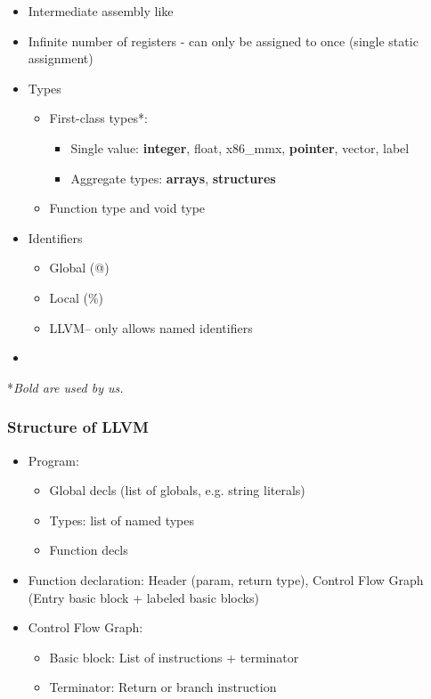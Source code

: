 \begin{itemize}
    \item Intermediate assembly like
    \item Infinite number of registers - can only be assigned to once (single static assignment)
    \item Types
    \begin{itemize}
        \item First-class types*: 
        \begin{itemize}
            \item Single value: \textbf{integer}, float, x86\_mmx, \textbf{pointer}, vector, label
            \item Aggregate types: \textbf{arrays}, \textbf{structures}
        \end{itemize}
        \item Function type and void type
    \end{itemize}
    \item Identifiers
    \begin{itemize}
        \item Global (@)
        \item Local (\%)
        \item LLVM-- only allows named identifiers
    \end{itemize}
    \item 
\end{itemize}

*\textit{Bold are used by us.}\\

\subsubsection{Structure of LLVM}

\begin{itemize}
    \item Program:
    \begin{itemize}
        \item Global decls (list of globals, e.g. string literals)
        \item Types: list of named types
        \item Function decls
    \end{itemize}
    \item Function declaration: Header (param, return type), Control Flow Graph (Entry basic block + labeled basic blocks)
    \item Control Flow Graph:
    \begin{itemize}
        \item Basic block: List of instructions + terminator
        \item Terminator: Return or branch instruction
    \end{itemize}
\end{itemize}

